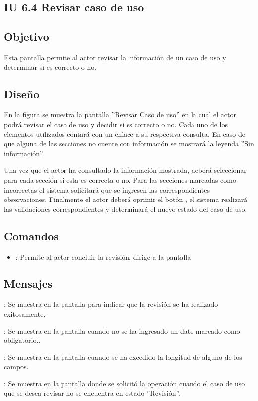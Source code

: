 \subsection{IU 6.4 Revisar caso de uso}

\subsection{Objetivo}
	Esta pantalla permite al actor revisar la información de un caso de uso y determinar si es correcto o no.
\subsection{Diseño}
	En la figura  se muestra la pantalla ''Revisar Caso de uso'' en la cual el actor podrá revisar el caso de uso y decidir si es correcto o no. Cada uno de los elementos utilizados contará con un enlace a su respectiva consulta. En caso de que alguna de las secciones no cuente con información se mostrará la leyenda ''Sin información''.
	
	Una vez que el actor ha consultado la información mostrada, deberá seleccionar para cada sección si esta es correcta o no. Para las secciones marcadas como incorrectas el sistema solicitará que se ingresen las correspondientes observaciones. Finalmente el actor deberá oprimir el botón  , el sistema realizará las validaciones correspondientes y determinará el nuevo estado del caso de uso.

\subsection{Comandos}
\begin{itemize}
	\item {}: Permite al actor concluir la revisión, dirige a la pantalla 
\end{itemize}

\subsection{Mensajes}

\begin{Citemize}
	\item {}: Se muestra en la pantalla  para indicar que la revisión se ha realizado exitosamente.
	\item {}: Se muestra en la pantalla  cuando no se ha ingresado un dato marcado como obligatorio..
	\item {}: Se muestra en la pantalla  cuando se ha excedido la longitud de alguno de los campos.
	\item {}: Se muestra en la pantalla donde se solicitó la operación cuando el caso de uso que se desea revisar no se encuentra en estado ''Revisión''.
\end{Citemize}
